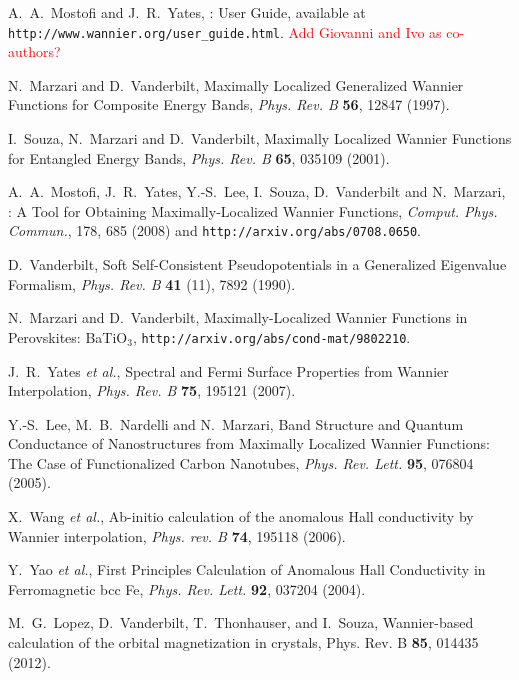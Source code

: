 \documentclass[a4paper,11pt,twoside]{article}
\begin{document}
\begin{thebibliography}{99}

 A.~A.~Mostofi and J.~R.~Yates, \wannier: User
  Guide, available at {\tt http://www.wannier.org/user\_guide.html}.
\textcolor{red}{Add Giovanni and Ivo as co-authors?}

 N.~Marzari and D.~Vanderbilt, 
  Maximally Localized Generalized Wannier Functions for Composite
  Energy Bands, {\it Phys. Rev. B} {\bf 56}, 12847 (1997).  

 I.~Souza, N.~Marzari and D.~Vanderbilt, Maximally
     Localized Wannier Functions for Entangled Energy Bands, {\it
     Phys. Rev. B} {\bf 65}, 035109 (2001).

 A.~A.~Mostofi, J.~R.~Yates, Y.-S.~Lee, I.~Souza,
   D.~Vanderbilt and N.~Marzari, \wannier: A Tool for Obtaining
   Maximally-Localized Wannier Functions, {\it Comput. Phys. Commun.},
   178, 685 (2008) and {\tt http://arxiv.org/abs/0708.0650}.

 D.~Vanderbilt, Soft Self-Consistent Pseudopotentials in
  a Generalized Eigenvalue Formalism, {\it Phys. Rev. B} {\bf 41}
  (11), 7892 (1990).

 N.~Marzari and D.~Vanderbilt, Maximally-Localized
  Wannier Functions in Perovskites: BaTiO$_3$,
  {\tt http://arxiv.org/abs/cond-mat/9802210}.

 J.~R.~Yates {\it et al.}, Spectral and Fermi
  Surface Properties from Wannier Interpolation, {\it Phys. Rev. B}
  {\bf 75}, 195121 (2007). 

 Y.-S.~Lee, M.~B.~Nardelli and N.~Marzari, Band
  Structure and Quantum Conductance of Nanostructures from Maximally
  Localized Wannier Functions: The Case of Functionalized Carbon
  Nanotubes, {\it Phys. Rev. Lett.} {\bf 95}, 076804 (2005).

 X.~Wang {\it et al.}, Ab-initio calculation of
  the anomalous Hall conductivity by Wannier interpolation,
{\it Phys. rev. B} {\bf 74}, 195118 (2006).

 Y.~Yao {\it et al.}, First Principles Calculation
  of Anomalous Hall Conductivity in Ferromagnetic bcc Fe,
{\it Phys. Rev. Lett.} {\bf 92}, 037204 (2004).

 M.~G.~Lopez, D.~Vanderbilt, T.~Thonhauser, and I.~Souza,
Wannier-based calculation of the orbital magnetization in crystals,
Phys. Rev. B {\bf 85}, 014435 (2012).

\end{thebibliography}
\end{document}
